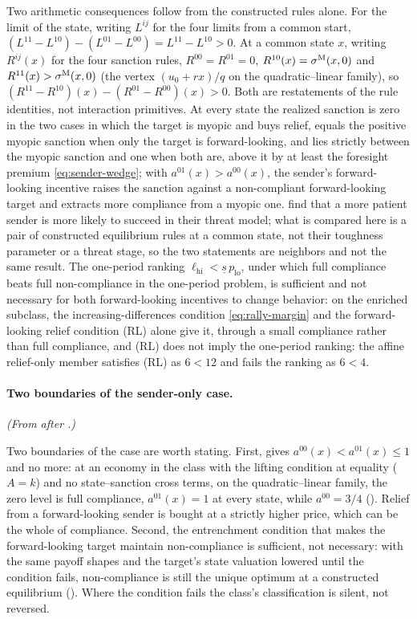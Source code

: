 Two arithmetic
consequences follow from the constructed rules alone. For the limit of the state,
writing $L^{ij}$ for the four limits from a common start,
$(L^{11}-L^{10})-(L^{01}-L^{00})=L^{11}-L^{10}>0$. At a common state $x$,
writing $R^{ij}(x)$
for the four sanction rules, $R^{00}=R^{01}=0$, $R^{10}(x)=\sigma^{\mathrm{M}}(x,0)$
and $R^{11}(x)>\sigma^{\mathrm{M}}(x,0)$ (the vertex $(u_0+rx)/q$ on the quadratic--linear
family), so
$(R^{11}-R^{10})(x)-(R^{01}-R^{00})(x)>0$. Both are restatements of the rule
identities, not interaction primitives. At every state the realized sanction is
zero in the two cases in which the target is myopic and buys
relief, equals the positive myopic sanction when only the target is forward-looking, and
lies strictly between the myopic sanction and one when both are, above it by
at least the foresight premium \eqref{eq:sender-wedge}; with
$a^{01}(x)>a^{00}(x)$, the sender's forward-looking incentive raises the sanction against a non-compliant
forward-looking target and extracts more compliance from a myopic one. \citet{Eaton1992} find that a more patient sender is more likely to succeed
in their threat model; what is compared here is a pair of constructed
equilibrium rules at a common state, not their toughness parameter or a threat
stage, so the two statements are neighbors and not the same result. The one-period ranking
$\ell_{\mathrm{hi}}<\underline s\,p_{\mathrm{lo}}$, under which full compliance beats full non-compliance in the one-period problem, is sufficient and not necessary for both forward-looking incentives to change behavior: on the
enriched subclass, the increasing-differences condition \eqref{eq:rally-margin} and the forward-looking relief condition \textup{(RL)} alone give it,
through a small compliance rather than full compliance, and \textup{(RL)}
does not imply the one-period ranking: the affine relief-only member satisfies
\textup{(RL)} as $6<12$ and fails the ranking as $6<4$.

\paragraph{Two boundaries of the sender-only case.} \emph{(From after .)}

Two boundaries of the case are worth stating. First, 
gives $a^{00}(x)<a^{01}(x)\le1$ and no more: at an economy in the class with
the lifting condition at equality ($A=k$) and no state--sanction cross terms, on the quadratic--linear
family, the zero level is full
compliance, $a^{01}(x)=1$ at every state, while $a^{00}=3/4$
(). Relief from a
forward-looking sender is bought at a strictly higher price, which can be the
whole of compliance. Second, the entrenchment condition that makes the
forward-looking target maintain non-compliance is sufficient, not necessary: with the same payoff
shapes and the target's state valuation lowered until the condition fails,
non-compliance is still the unique optimum at a constructed equilibrium
(). Where the condition fails the
class's classification is silent, not reversed.

